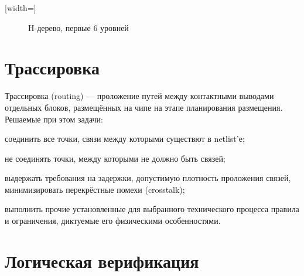 {
  [width=\pgfdecoratedinputsegmentremainingdistance]
  {
    \pgfpathmoveto{\pgfpoint{0pt}{0.35355\pgfdecoratedinputsegmentremainingdistance}}
    \pgfpathlineto{\pgfpoint{0pt}{-0.35355\pgfdecoratedinputsegmentremainingdistance}}
    \pgfpathmoveto{\pgfpoint{0pt}{0pt}}
    \pgfpathlineto{\pgfpoint{\pgfdecoratedinputsegmentremainingdistance}{0pt}}
    \pgfpathmoveto{\pgfpoint{\pgfdecoratedinputsegmentremainingdistance}{0.35355\pgfdecoratedinputsegmentremainingdistance}}
    \pgfpathlineto{\pgfpoint{\pgfdecoratedinputsegmentremainingdistance}{-0.35355\pgfdecoratedinputsegmentremainingdistance}}
    \pgfpathmoveto{\pgfpoint{\pgfdecoratedinputsegmentremainingdistance}{0pt}}
  }
}
\begin{figure}
\centering
{}
    \caption{H-дерево, первые 6 уровней}
    \label{fig:htree}
\end{figure}

\section{Трассировка}\label{trace}

Трассировка (\abbr routing) — проложение путей между контактными выводами отдельных блоков, размещённых на чипе на этапе планирования размещения. Решаемые при этом задачи:
\begin{itemize*}
    \item соединить все точки, связи между которыми существют в netlist'е;
    \item не соединять точки, между которыми не должно быть связей;
    \item выдержать требования на задержки, допустимую плотность проложения связей, минимизировать перекрёстные помехи (\abbr crosstalk);
    \item выполнить прочие установленные для выбранного технического процесса правила и ограничения, диктуемые его физическими особенностями.
\end{itemize*}

\section{Логическая верификация}\label{logicverif}

